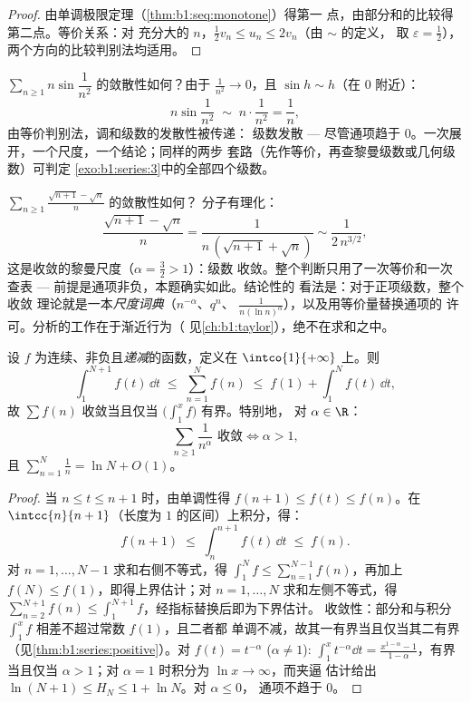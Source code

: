 \begin{proof}
由单调极限定理（\cref{thm:b1:seq:monotone}）得第一
点，由部分和的比较得第二点。等价关系：对
充分大的 $n$，$\frac12 v_n \leq u_n \leq 2 v_n$（由 $\sim$ 的定义，
取 $\varepsilon = \frac12$），两个方向的比较判别法均适用。
\end{proof}

\begin{example}[用等价量证明发散]\label{ex:b1:series:equivdiverge}
$\sum_{n\geq1} n\sin\dfrac{1}{n^2}$ 的敛散性如何？由于
$\frac{1}{n^2} \to 0$，且 $\sin h \sim h$（在 $0$ 附近）：
\[
n\sin\frac{1}{n^2} \;\sim\; n\cdot\frac{1}{n^2} = \frac1n ,
\]
由等价判别法，调和级数的发散性被传递：
级数发散 --- 尽管通项趋于
$0$。一次展开，一个尺度，一个结论；同样的两步
套路（先作等价，再查黎曼级数或几何级数）可判定
\cref{exo:b1:series:3}中的全部四个级数。
\end{example}

\begin{example}[一行内的等价判别法]\label{ex:b1:series:equivtest}
$\sum_{n \geq 1} \frac{\sqrt{n+1} - \sqrt n}{n}$ 的敛散性如何？
分子有理化：
\[
\frac{\sqrt{n+1} - \sqrt n}{n}
= \frac{1}{n\,(\sqrt{n+1} + \sqrt n)}
\sim \frac{1}{2\,n^{3/2}} ,
\]
这是收敛的黎曼尺度（$\alpha = \frac32 > 1$）：级数
收敛。整个判断只用了一次等价和一次查表
--- 前提是通项非负，本题确实如此。结论性的
看法是：对于正项级数，整个收敛
理论就是一本\emph{尺度词典}（$n^{-\alpha}$、$q^n$、
$\frac{1}{n(\ln n)^\alpha}$），以及用等价量替换通项的
许可。分析的工作在于渐近行为（
见\cref{ch:b1:taylor}），绝不在求和之中。
\end{example}

\begin{theorem}\label{thm:b1:series:riemann}
设 $f$ 为连续、非负且\emph{递减}的函数，定义在
$\intco{1}{+\infty}$ 上。则
\[
\int_1^{N+1} f(t)\,\dd t \;\leq\; \sum_{n=1}^{N} f(n) \;\leq\; f(1)
+ \int_1^{N} f(t)\,\dd t ,
\]
故 $\sum f(n)$ 收敛当且仅当 $\bigl(\int_1^x f\bigr)$ 有界。特别地，
对 $\alpha \in \R$：
\[
\sum_{n \geq 1} \frac{1}{n^\alpha} \text{ 收敛}
\iff \alpha > 1,
\]
且 $\sum_{n=1}^{N} \frac1n = \ln N + O(1)$。
\end{theorem}

\begin{proof}
当 $n \leq t \leq n+1$ 时，由单调性得 $f(n+1) \leq f(t)
\leq f(n)$。在 $\intcc{n}{n+1}$（长度为
$1$ 的区间）上积分，得：
\[
f(n+1) \;\leq\; \int_n^{n+1} f(t)\,\dd t \;\leq\; f(n) .
\]
对 $n = 1, \dots, N-1$ 求和右侧不等式，得
$\int_1^{N} f \leq \sum_{n=1}^{N-1} f(n)$，再加上
$f(N) \leq f(1)$，即得上界估计；对
$n = 1, \dots, N$ 求和左侧不等式，得 $\sum_{n=2}^{N+1} f(n) \leq
\int_1^{N+1} f$，经指标替换后即为下界估计。
收敛性：部分和与积分 $\int_1^x f$
相差不超过常数 $f(1)$，且二者都
单调不减，故其一有界当且仅当其二有界
（见\cref{thm:b1:series:positive}）。对 $f(t)
= t^{-\alpha}$ ($\alpha \neq 1$): $\int_1^x t^{-\alpha}\dd t =
\frac{x^{1-\alpha} - 1}{1 - \alpha}$，有界当且仅当 $\alpha > 1$；对
$\alpha = 1$ 时积分为 $\ln x \to \infty$，而夹逼
估计给出 $\ln(N+1) \leq H_N \leq 1 + \ln N$。对 $\alpha \leq 0$，
通项不趋于 $0$。
\end{proof}

